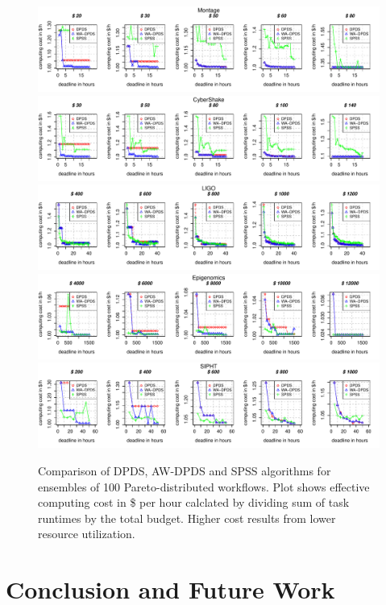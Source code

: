 \documentclass{sig-alternate}
\begin{document}
\begin{figure}[htb] 
\centering
\includegraphics[width=1.0\textwidth]{figures/cost-MONTAGE-n-1000-8-dagh1-20m0.pdf}
\includegraphics[width=1.0\textwidth]{figures/cost-CYBERSHAKE-n-1000-8-dagh1-20m0.pdf}
\includegraphics[width=1.0\textwidth]{figures/cost-LIGO-n-1000-8-dagh1-40m0.pdf}
\includegraphics[width=1.0\textwidth]{figures/cost-GENOME-n-1000-8-dagh100-1500m0.pdf}
\includegraphics[width=1.0\textwidth]{figures/cost-SIPHT-n-1000-8-dagh5-50m0.pdf}
\caption{Comparison of DPDS, AW-DPDS and SPSS algorithms for ensembles of 100
Pareto-distributed workflows. Plot shows effective computing cost in \$ per
hour calclated by dividing sum of task runtimes by the total budget. Higher
cost results from lower resource utilization.}
\label{fig:}
\end{figure}



\section{Conclusion and Future Work}







\end{document}
